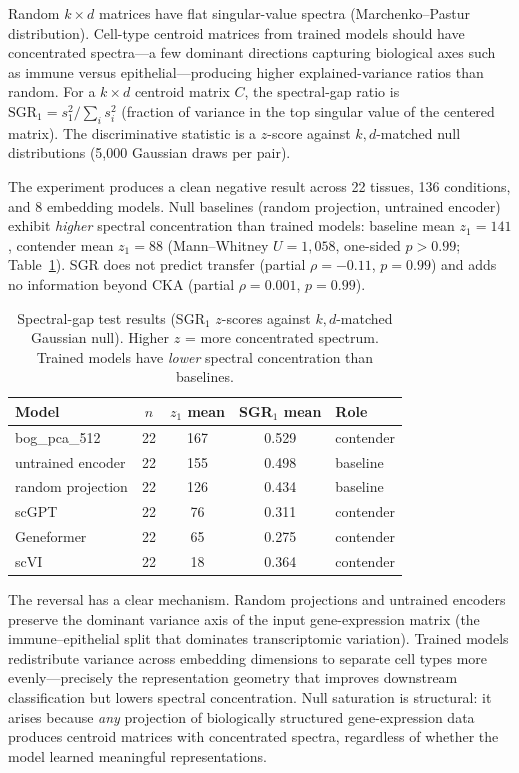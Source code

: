 \documentclass[11pt]{article}
\begin{document}
Random $k \times d$ matrices have flat singular-value spectra
(Marchenko--Pastur distribution). Cell-type centroid matrices from
trained models should have concentrated spectra---a few dominant
directions capturing biological axes such as immune versus
epithelial---producing higher explained-variance ratios than random.
For a $k \times d$ centroid matrix $C$, the spectral-gap ratio is
$\mathrm{SGR}_1 = s_1^2 / \sum_i s_i^2$ (fraction of variance in the
top singular value of the centered matrix). The discriminative
statistic is a $z$-score against $k,d$-matched null distributions
(5,000 Gaussian draws per pair).

The experiment produces a clean negative result across 22 tissues,
136 conditions, and 8 embedding models. Null baselines (random
projection, untrained encoder) exhibit \emph{higher} spectral
concentration than trained models: baseline mean $z_1 = 141$,
contender mean $z_1 = 88$ (Mann--Whitney $U = 1{,}058$, one-sided
$p > 0.99$; Table~\ref{tab:sgr}). SGR does not predict transfer
(partial $\rho = -0.11$, $p = 0.99$) and adds no information beyond
CKA (partial $\rho = 0.001$, $p = 0.99$).

\begin{table}[t]
\centering
\caption{Spectral-gap test results (SGR$_1$ $z$-scores against
$k,d$-matched Gaussian null). Higher $z$ = more concentrated spectrum.
Trained models have \emph{lower} spectral concentration than
baselines.}
\label{tab:sgr}
\small
\begin{tabular}{@{}lcccl@{}}
\toprule
Model & $n$ & $z_1$ mean & SGR$_1$ mean & Role \\
\midrule
bog\_pca\_512           & 22 & 167 & 0.529 & contender \\
untrained encoder       & 22 & 155 & 0.498 & baseline \\
random projection       & 22 & 126 & 0.434 & baseline \\
scGPT                   & 22 & 76  & 0.311 & contender \\
Geneformer              & 22 & 65  & 0.275 & contender \\
scVI                    & 22 & 18  & 0.364 & contender \\
\bottomrule
\end{tabular}
\end{table}

The reversal has a clear mechanism. Random projections and untrained
encoders preserve the dominant variance axis of the input gene-expression
matrix (the immune--epithelial split that dominates transcriptomic
variation). Trained models redistribute variance across embedding
dimensions to separate cell types more evenly---precisely the
representation geometry that improves downstream classification but
lowers spectral concentration. Null saturation is structural: it
arises because \emph{any} projection of biologically structured
gene-expression data produces centroid matrices with concentrated
spectra, regardless of whether the model learned meaningful
representations.
\end{document}
